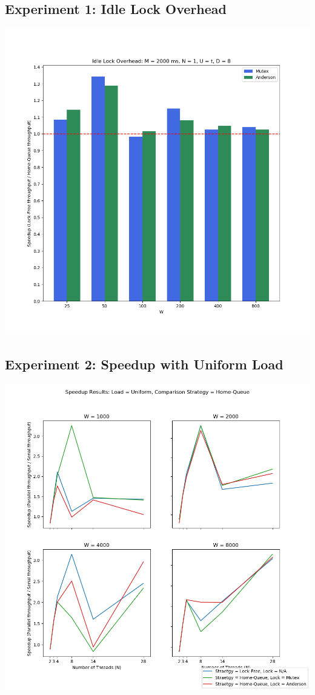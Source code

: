 \documentclass[]{article}
\begin{document}
\subsection{Experiment 1: Idle Lock Overhead}
\includegraphics[scale=0.5]{graphs/overhead.png}\\
\subsection{Experiment 2: Speedup with Uniform Load}
\includegraphics[scale=0.5]{graphs/speedup_t:H.png}\\
\end{document}
